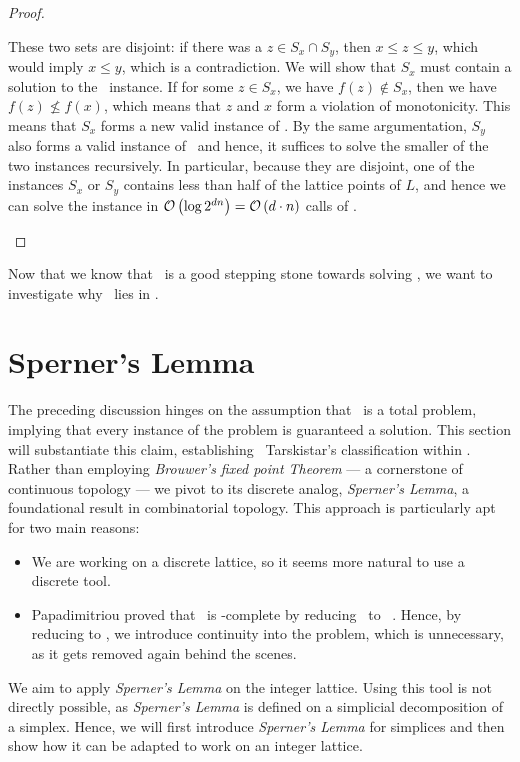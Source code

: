 \begin{proof}
\begin{case}{3}
        These two sets are disjoint: if there was a $z \in S_x \cap S_y$, then $x \leq z \leq y$, which would imply $x \leq y$, which is a contradiction. We will show that $S_x$ must contain a solution to the \Tarski\ instance.
        If for some $z \in S_x$, we have $f(z) \not\in S_x$, then we have $f(z) \not\leq f(x)$, which means that $z$ and $x$ form a violation of monotonicity. This means that $S_x$ forms a new valid instance of \Tarski. By the same argumentation, $S_y$ also forms a valid instance of \Tarski\, and hence, it suffices to solve the smaller of the two instances recursively. In particular, because they are disjoint, one of the instances $S_x$ or $S_y$ contains less than half of the lattice points of $L$, and hence we can solve the instance in $\mathcal{O}\left(\log{2^{dn}}\right) = \mathcal{O}\left(d \cdot n\right)$ calls of \Tarskistar.
    \end{case}
\end{proof}

Now that we know that \Tarskistar\ is a good stepping stone towards solving \Tarski, we want to investigate why \Tarskistar\ lies in \PPAD.

\section{Sperner's Lemma}

The preceding discussion hinges on the assumption that \Tarskistar\ is a total problem, implying that every instance of the problem is guaranteed a solution. This section will substantiate this claim, establishing \ Tarskistar's classification within \TFNP. Rather than employing \textit{Brouwer's fixed point Theorem} --- a cornerstone of continuous topology --- we pivot to its discrete analog, \textit{Sperner's Lemma}, a foundational result in combinatorial topology. This approach is particularly apt for two main reasons:
\begin{itemize}
    \item We are working on a discrete lattice, so it seems more natural to use a discrete tool.
    \item Papadimitriou proved that \Brouwer\ is \PPAD-complete by reducing \Brouwer\ to \Sperner\ . Hence, by reducing to \Brouwer, we introduce continuity into the problem, which is unnecessary, as it gets removed again behind the scenes.
\end{itemize}

We aim to apply \textit{Sperner's Lemma} on the integer lattice. Using this tool is not directly possible, as \textit{Sperner's Lemma} is defined on a simplicial decomposition of a simplex. Hence, we will first introduce \textit{Sperner's Lemma} for simplices and then show how it can be adapted to work on an integer lattice.

